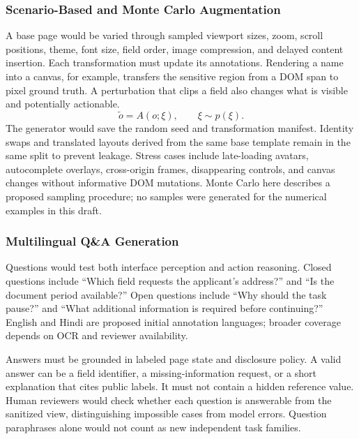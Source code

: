 \documentclass[conference]{IEEEtran}
\begin{document}
\subsubsection{Scenario-Based and Monte Carlo Augmentation}
A base page would be varied through sampled viewport sizes, zoom, scroll positions, theme, font size, field order, image compression, and delayed content insertion. Each transformation must update its annotations. Rendering a name into a canvas, for example, transfers the sensitive region from a DOM span to pixel ground truth. A perturbation that clips a field also changes what is visible and potentially actionable.
\begin{equation}
 \widetilde{o}=A(o;\xi),\qquad \xi\sim p(\xi).
\end{equation}
The generator would save the random seed and transformation manifest. Identity swaps and translated layouts derived from the same base template remain in the same split to prevent leakage. Stress cases include late-loading avatars, autocomplete overlays, cross-origin frames, disappearing controls, and canvas changes without informative DOM mutations. Monte Carlo here describes a proposed sampling procedure; no samples were generated for the numerical examples in this draft.

\subsubsection{Multilingual Q\&A Generation}
Questions would test both interface perception and action reasoning. Closed questions include ``Which field requests the applicant's address?'' and ``Is the document period available?'' Open questions include ``Why should the task pause?'' and ``What additional information is required before continuing?'' English and Hindi are proposed initial annotation languages; broader coverage depends on OCR and reviewer availability.

Answers must be grounded in labeled page state and disclosure policy. A valid answer can be a field identifier, a missing-information request, or a short explanation that cites public labels. It must not contain a hidden reference value. Human reviewers would check whether each question is answerable from the sanitized view, distinguishing impossible cases from model errors. Question paraphrases alone would not count as new independent task families.
\end{document}
